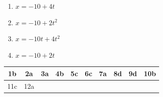 \begin{enumerate}
\begin{center}
\end{center}


\begin{enumerate}[label=\Alph*)]
\item $x=-10+4t$
\item $x=-10+2t^2$
\item $x=-10t+4t^2$
\item $x=-10+2t$
\end{enumerate}

\end{enumerate}




\begin{table}[h!]
\centering
\begin{tabular}{|c|c|c|c|c|c|c|c|c|c|}
\hline
1b & 2a & 3a & 4b & 5c & 6c & 7a & 8d & 9d & 10b \\ \hline
11c & 12a &  &  &  &  &  &  &  &  \\ \hline
\end{tabular}
\end{table}




